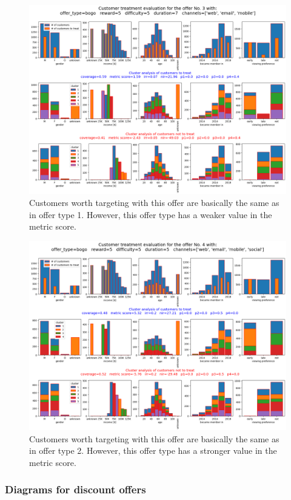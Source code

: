 \documentclass[11pt]{article} %
\begin{document}
\begin{figure}[H]
\includegraphics[height=0.5\textheight]{results/results3.png}
\caption{Customers worth targeting with this offer are basically the same as in offer type 1. However, this offer type has a weaker value in the metric score.}
\end{figure}
\begin{figure}[H]
\includegraphics[height=0.5\textheight]{results/results4.png}
\caption{Customers worth targeting with this offer are basically the same as in offer type 2. However, this offer type has a stronger value in the metric score.}
\end{figure}
\subsubsection{Diagrams for discount offers}
\end{document}
